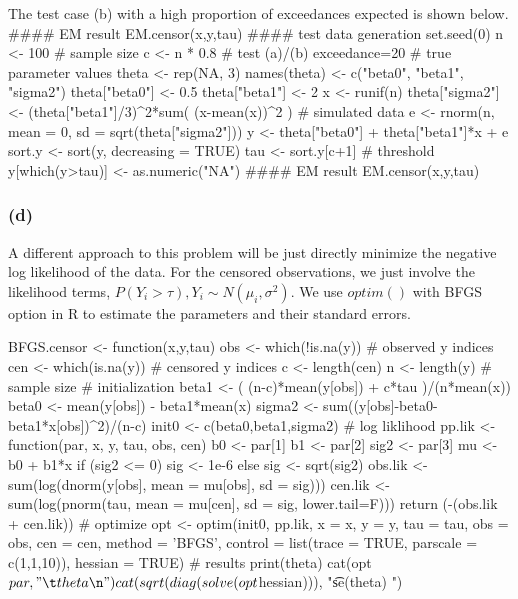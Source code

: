\documentclass{article}
\begin{document}
\newpage
The test case (b) with a high proportion of exceedances expected is shown below.
#### EM result
EM.censor(x,y,tau)
#### test data generation
set.seed(0)
n <- 100 # sample size
c <- n * 0.8 # test (a)/(b) exceedance=20%
# true parameter values
theta <- rep(NA, 3)
names(theta) <- c("beta0", "beta1", "sigma2")
theta["beta0"]  <- 0.5
theta["beta1"]  <- 2
x <- runif(n)
theta["sigma2"] <- (theta["beta1"]/3)^2*sum( (x-mean(x))^2 )
# simulated data
e <- rnorm(n, mean = 0, sd = sqrt(theta["sigma2"]))
y <- theta["beta0"] + theta["beta1"]*x + e
sort.y <- sort(y, decreasing = TRUE)
tau <- sort.y[c+1] # threshold
y[which(y>tau)] <- as.numeric("NA")
#### EM result
EM.censor(x,y,tau)


\newpage
\subsubsection*{(d)}
\hspace{12 pt} A different approach to this problem will be just directly minimize the negative log likelihood of the data.
For the censored observations, we just involve the likelihood terms, $P(Y_i>\tau), Y_i\sim N(\mu_i,\sigma^2)$. We use $optim()$
with BFGS option in R to estimate the parameters and their standard errors. 

BFGS.censor <- function(x,y,tau){
	obs <- which(!is.na(y)) # observed y indices
	cen <- which(is.na(y))  # censored y indices
	c <- length(cen)
	n <- length(y)  # sample size
	# initialization
	beta1  <- ( (n-c)*mean(y[obs]) + c*tau )/(n*mean(x))
	beta0  <- mean(y[obs]) - beta1*mean(x)
	sigma2 <- sum((y[obs]-beta0-beta1*x[obs])^2)/(n-c)
	init0 <- c(beta0,beta1,sigma2)
	# log liklihood
	pp.lik <- function(par, x, y, tau, obs, cen) {
	  b0   <- par[1]
	  b1   <- par[2]
	  sig2 <- par[3]
		mu  <- b0 + b1*x
		if (sig2 <= 0){
			sig <- 1e-6
		}
		else{
			sig <- sqrt(sig2)
		}
		obs.lik <- sum(log(dnorm(y[obs], mean = mu[obs], sd = sig)))
		cen.lik <- sum(log(pnorm(tau, mean = mu[cen], sd = sig, lower.tail=F)))
		return (-(obs.lik + cen.lik))
	}
	# optimize
	opt <- optim(init0, pp.lik, x = x, y = y, tau = tau, obs = obs, cen = cen, 
	method = 'BFGS', control = list(trace = TRUE, parscale = c(1,1,10)), hessian = TRUE) 
	# results
	print(theta)
	cat(opt$par,"\t theta \n")
	cat(sqrt(diag(solve(opt$hessian))), "\t se(theta) \n")
}
\end{document}
